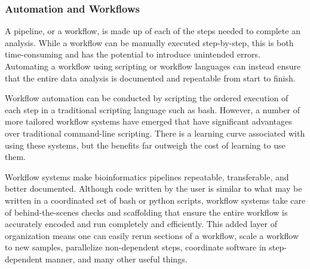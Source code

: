 \documentclass[10pt,letterpaper]{article}
\begin{document}
\subsubsection*{Automation and Workflows}
A pipeline, or a workflow, is made up of each of the steps needed to complete an analysis.
While a workflow can be manually executed step-by-step, this is both time-consuming and has the potential to introduce unintended errors. 
Automating a workflow using scripting or workflow languages can instead ensure that the entire data analysis is documented and repeatable from start to finish. 

Workflow automation can be conducted by scripting the ordered execution of each step in a traditional scripting language such as bash. 
However, a number of more tailored workflow systems have emerged that have significant advantages over traditional command-line scripting. 
There is a learning curve associated with using these systems, but the benefits far outweigh the cost of learning to use them. 



Workflow systems make bioinformatics pipelines repeatable, transferable, and better documented. 
Although code written by the user is similar to what may be written in a coordinated set of bash or python scripts, workflow systems take care of behind-the-scenes checks and scaffolding that ensure the entire workflow is accurately encoded and run completely and efficiently. 
This added layer of organization means one can easily rerun sections of a workflow, scale a workflow to new samples, parallelize non-dependent steps, coordinate software in step-dependent manner, and many other useful things. 
\end{document}
